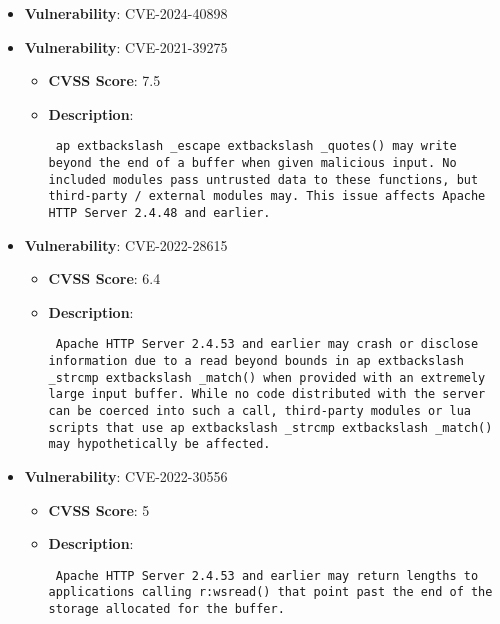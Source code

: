 \documentclass{article}
\begin{document}
\begin{itemize}
        \item \textbf{Vulnerability}: CVE-2024-40898
    
        \item \textbf{Vulnerability}: CVE-2021-39275
        \begin{itemize}
            \item \textbf{CVSS Score}:  7.5 
            \item \textbf{Description}: \parbox{\linewidth}{\texttt{ ap	extbackslash _escape	extbackslash _quotes() may write beyond the end of a buffer when given malicious input. No included modules pass untrusted data to these functions, but third-party / external modules may. This issue affects Apache HTTP Server 2.4.48 and earlier. }}
        \end{itemize}
    
        \item \textbf{Vulnerability}: CVE-2022-28615
        \begin{itemize}
            \item \textbf{CVSS Score}:  6.4 
            \item \textbf{Description}: \parbox{\linewidth}{\texttt{ Apache HTTP Server 2.4.53 and earlier may crash or disclose information due to a read beyond bounds in ap	extbackslash _strcmp	extbackslash _match() when provided with an extremely large input buffer. While no code distributed with the server can be coerced into such a call, third-party modules or lua scripts that use ap	extbackslash _strcmp	extbackslash _match() may hypothetically be affected. }}
        \end{itemize}
    
        \item \textbf{Vulnerability}: CVE-2022-30556
        \begin{itemize}
            \item \textbf{CVSS Score}:  5 
            \item \textbf{Description}: \parbox{\linewidth}{\texttt{ Apache HTTP Server 2.4.53 and earlier may return lengths to applications calling r:wsread() that point past the end of the storage allocated for the buffer. }}
        \end{itemize}
    

\end{itemize}
\end{document}
